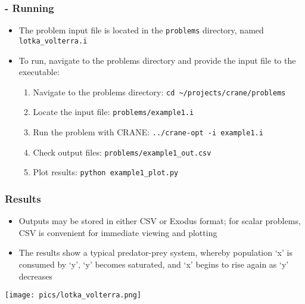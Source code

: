 \begin{frame}[fragile]
	\frametitle{\insertsubsectionhead \hspace{1pt} - Running}
		\begin{itemize}
			\item The problem input file is located in the \texttt{problems} directory, named \texttt{lotka\_volterra.i}
			\item To run, navigate to the problems directory and provide the input file to the executable:
			\begin{enumerate}
				\item Navigate to the problems directory: \newline
				\hspace*{8pt} \texttt{cd \textasciitilde/projects/crane/problems}
				\item Locate the input file: \newline
				\hspace*{8pt} \texttt{problems/example1.i}
				\item Run the problem with CRANE: \newline
				\hspace*{8pt} \texttt{../crane-opt -i example1.i}
				\item Check output files: \newline
				\hspace*{8pt} \texttt{problems/example1\_out.csv}
				\item Plot results: \newline
				\hspace*{8pt} \texttt{python example1\_plot.py}
			\end{enumerate}
		\end{itemize}
\end{frame}

\begin{frame}
	\frametitle{\insertsubsectionhead \hspace{1pt} Results}
	\begin{minipage}{0.5\linewidth}
		\begin{itemize}
			\item Outputs may be stored in either CSV or Exodus format; for scalar problems, CSV is convenient for immediate viewing and plotting
			\item The results show a typical predator-prey system, whereby population `x' is consumed by `y', `y' becomes saturated, and `x' begins to rise again as `y' decreases
		\end{itemize}
	\end{minipage}%
	\begin{minipage}{0.5\linewidth}
	\centering
	\texttt{[image: pics/lotka\_volterra.png]}
	\end{minipage}
\end{frame}